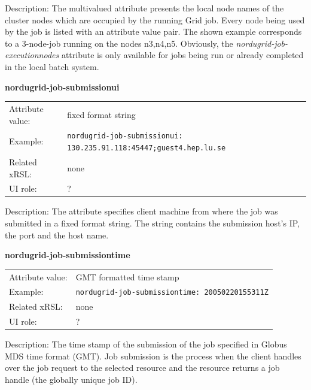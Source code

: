 \documentclass{article}
\begin{document}
Description: The multivalued attribute presents the local node names of the cluster
nodes which are occupied by the running Grid job. Every node being used by the job is 
listed with an attribute value pair. The shown example corresponds to a 3-node-job 
running on the nodes n3,n4,n5. Obviously, the {\it nordugrid-job-executionnodes}
attribute is only available for jobs being run or already completed 
in the local batch system.


  \hspace*{0.5cm}
  \begin{shaded}
    \textbf{nordugrid-job-submissionui}
  \end{shaded}
  \begin{tabular}{lp{10cm}}  
    Attribute value:& fixed format string\\
    Example:& \verb#nordugrid-job-submissionui: 130.235.91.118:45447;guest4.hep.lu.se#\\
    Related xRSL:& none\\
    UI role:& ?\\
  \end{tabular}

Description: The attribute specifies client machine from where the job was submitted
in a fixed format string. The string contains the submission host's IP,
the port and the host name.


  \hspace*{0.5cm}
  \begin{shaded}
    \textbf{nordugrid-job-submissiontime}
  \end{shaded}
  \begin{tabular}{lp{10cm}}  
    Attribute value:& GMT formatted time stamp\\
    Example:& \verb#nordugrid-job-submissiontime: 20050220155311Z#\\
    Related xRSL:& none\\
    UI role:& ? \\
  \end{tabular}

Description: The time stamp of the submission of the job specified 
in Globus MDS time format (GMT).
Job submission is the process when the client handles over the job request to the 
selected resource and the resource returns a job handle (the globally unique job ID).

\end{document}
